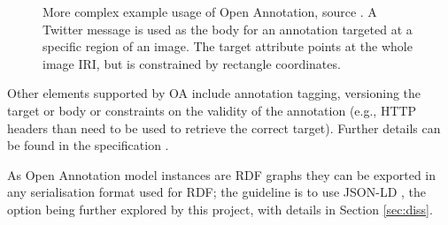 \begin{figure}[!ht]
  \centering
  \caption[Twitter message used to annotate an image region using Open Annotation.]
          {More complex example usage of Open Annotation, source \cite{ref:oahubble}.
           A Twitter message is used as the body for an annotation targeted at a
           specific region of an image. The target attribute points at the whole
           image IRI, but is constrained by rectangle coordinates.}
  \label{fig:oahubble}
\end{figure}

Other elements supported by OA include annotation tagging, versioning the
target or body or constraints on the validity of the annotation (e.g., HTTP
headers than need to be used to retrieve the correct target). Further details
can be found in the specification \cite{ref:oa}.

As Open Annotation model instances are RDF graphs they can be exported in any
serialisation format used for RDF; the guideline is to use JSON-LD
\cite{ref:oa}, the option being further explored by this project, with details
in Section \ref{sec:diss}.
